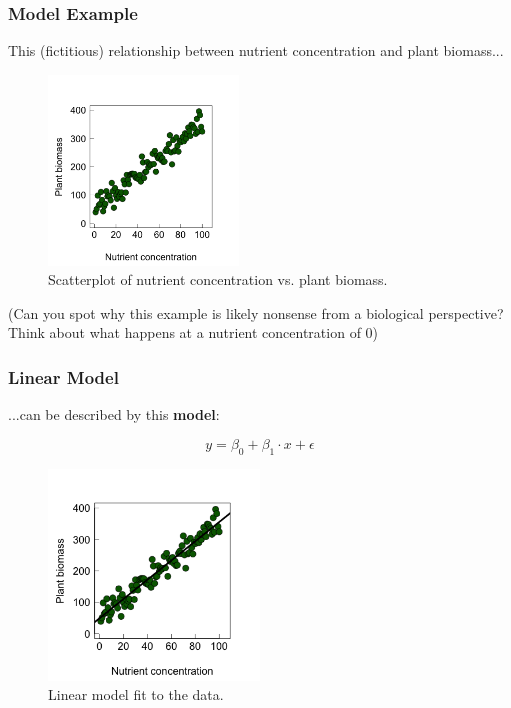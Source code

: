 \documentclass{beamer}
\begin{document}
\begin{frame}
  \frametitle{Model Example}
  \begin{block}{}
    This (fictitious) relationship between nutrient concentration and plant biomass...
  \end{block}
  
  \begin{figure}[h]
    \centering
    \includegraphics[width=0.45\textwidth]{lectures/day_2_LM_refresh_I/figures/unnamed-chunk-4-1.png}
    \caption{Scatterplot of nutrient concentration vs. plant biomass.}
  \end{figure}
    \tiny{(Can you spot why this example is likely nonsense from a biological perspective? Think about what happens at a nutrient concentration of 0)}
\end{frame}

\begin{frame}
  \frametitle{Linear Model}
  \begin{block}{}
    ...can be described by this \textbf{model}:
  \end{block}

  \begin{equation}
  y = \beta_0 + \beta_1 \cdot x + \epsilon
  \end{equation}

  \begin{figure}[h]
    \centering
    \includegraphics[width=0.5\textwidth]{lectures/day_2_LM_refresh_I/figures/unnamed-chunk-5-1.png} 
    \caption{Linear model fit to the data.}
  \end{figure}
\end{frame}
\end{document}
